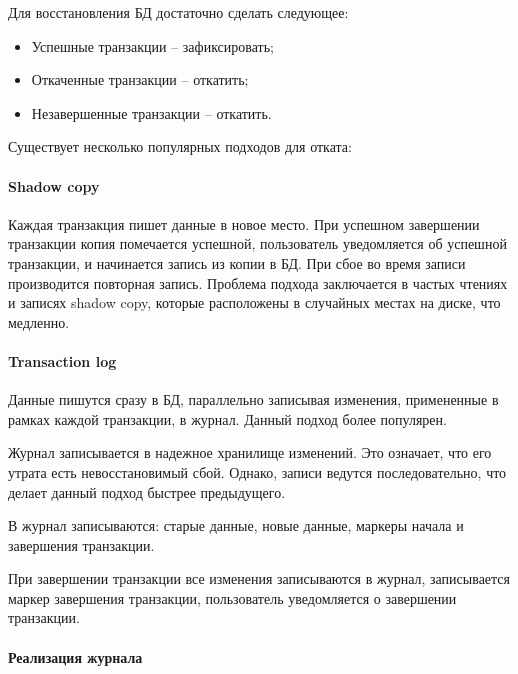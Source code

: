 Для восстановления БД достаточно сделать следующее:

\begin{itemize}
	\item Успешные транзакции -- зафиксировать;
	\item Откаченные транзакции -- откатить;
	\item Незавершенные транзакции -- откатить.
\end{itemize}

Существует несколько популярных подходов для отката:

\paragraph{Shadow copy}

Каждая транзакция пишет данные в новое место. При успешном завершении транзакции копия помечается
успешной, пользователь уведомляется об успешной транзакции, и начинается запись из копии в БД. При
сбое во время записи производится повторная запись. Проблема подхода заключается в частых чтениях и
записях shadow copy, которые расположены в случайных местах на диске, что медленно.

\paragraph{Transaction log}

Данные пишутся сразу в БД, параллельно записывая изменения, примененные в рамках каждой транзакции,
в журнал. Данный подход более популярен.

Журнал записывается в надежное хранилище изменений. Это означает, что его утрата есть
невосстановимый сбой. Однако, записи ведутся последовательно, что делает данный подход быстрее
предыдущего.

В журнал записываются: старые данные, новые данные, маркеры начала и завершения транзакции.

При завершении транзакции все изменения записываются в журнал, записывается маркер завершения
транзакции, пользователь уведомляется о завершении транзакции.

\paragraph{Реализация журнала}

